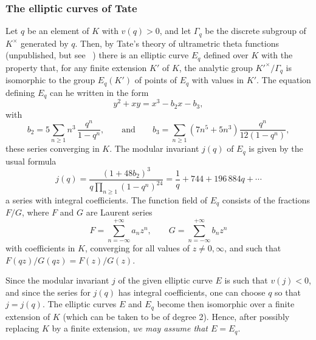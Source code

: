 \begin{subappendices}
\subsubsection{The elliptic curves of Tate}
\label{sec:IV_A11}
Let $q$ be an element of $K$ with $v(q) > 0$, and let $\Gamma_q$ be the
discrete subgroup of $K^\times$ generated by $q$. Then, by Tate's theory of
ultrametric theta functions (unpublished, but see 
\citeauthor{morikawa:theta}~\cite{morikawa:theta})
\dpage
there is an elliptic curve $E_q$ defined over $K$
with the property that, for any finite extension $K'$ of $K$, the analytic
group ${K'}^\times / \Gamma_q$ is isomorphic to the group $E_q(K')$ of points
of $E_q$ with values in $K'$. The equation defining $E_q$ can he written in the
form
\[
	y^2 + xy = x^3 - b_2x - b_3,
\]
with
\[
	b_2 = 5 \sum_{n\ge 1} n^3 \, \frac{q^n}{1-q^n}, \qquad \text{and}
	\qquad b_3 = \sum_{n\ge 1} (7n^5 + 5n^3) \frac{q^n}{12(1-q^n)},
\]
these series converging in $K$. The modular invariant $j(q)$ of $E_q$ is
given by the usual formula
\[
	j(q) = \frac{(1 + 48b_2)^3}{q \prod_{n\ge 1} (1 - q^n)^{24}}
	= \frac{1}{q} + 744 + 196\,884 q + \cdots
\]
a series with integral coefficients. The function field of $E_q$ consists
of the fractions $F/G$, where $F$ and $G$ are Laurent series
\[
	F = \sum_{n=-\infty}^{+\infty} a_n z^n, \qquad
	G = \sum_{n=-\infty}^{+\infty} b_n z^n
\]
with coefficients in $K$, converging for all values of $z \ne 0, \infty$, and
such that $F(qz)/G(qz) = F(z)/G(z)$.

Since the modular invariant $j$ of the given elliptic curve $E$
is such that $v(j) < 0$, and since the series for $j(q)$ has integral
coefficients, one can choose $q$ so that $j = j(q)$. The elliptic curves
$E$ and $E_q$ become then isomorphic over a finite extension of $K$
(which can be taken to be of degree 2). Hence, after possibly 
replacing $K$ by a finite extension, \emph{we may assume that $E = E_q$}.


\end{subappendices}
